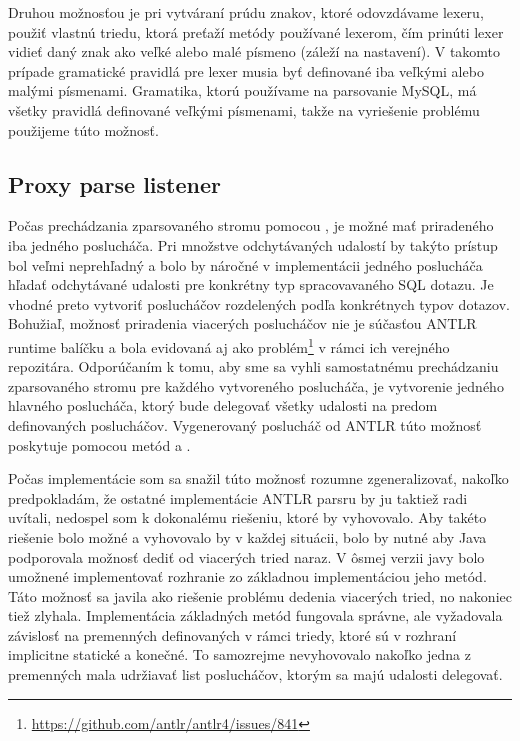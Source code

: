 Druhou možnosťou je pri vytváraní prúdu znakov, ktoré odovzdávame lexeru, použiť vlastnú triedu, ktorá preťaží metódy používané lexerom, čím prinúti lexer vidieť daný znak ako veľké alebo malé písmeno (záleží na nastavení). V takomto prípade gramatické pravidlá pre lexer musia byť definované iba veľkými alebo malými písmenami. Gramatika, ktorú používame na parsovanie MySQL, má všetky pravidlá definované veľkými písmenami, takže na vyriešenie problému použijeme túto možnosť. 

\subsection{Proxy parse listener}
Počas prechádzania zparsovaného stromu pomocou , je možné mať priradeného iba jedného poslucháča. Pri množstve odchytávaných udalostí by takýto prístup bol veľmi neprehľadný a bolo by náročné v implementácii jedného poslucháča hľadať odchytávané udalosti pre konkrétny typ spracovavaného SQL dotazu. Je vhodné preto vytvoriť poslucháčov rozdelených podľa konkrétnych typov dotazov. Bohužiaľ, možnosť priradenia viacerých poslucháčov nie je súčasťou ANTLR runtime balíčku a bola evidovaná aj ako problém\footnote{\url{https://github.com/antlr/antlr4/issues/841}} v rámci ich verejného repozitára. Odporúčaním k tomu, aby sme sa vyhli samostatnému prechádzaniu zparsovaného stromu pre každého vytvoreného poslucháča, je vytvorenie jedného hlavného poslucháča, ktorý bude delegovať všetky udalosti na predom definovaných poslucháčov. Vygenerovaný poslucháč od ANTLR túto možnosť poskytuje pomocou metód  a .

Počas implementácie som sa snažil túto možnosť rozumne zgeneralizovať, nakoľko predpokladám, že ostatné implementácie ANTLR parsru by ju taktiež radi uvítali, nedospel som k dokonalému riešeniu, ktoré by vyhovovalo. Aby takéto riešenie bolo možné a vyhovovalo by v každej situácii, bolo by nutné aby Java podporovala možnosť dediť od viacerých tried naraz. V ôsmej verzii javy bolo umožnené implementovať rozhranie zo základnou implementáciou jeho metód. Táto možnosť sa javila ako riešenie problému dedenia viacerých tried, no nakoniec tiež zlyhala. Implementácia základných metód fungovala správne, ale vyžadovala závislosť na premenných definovaných v rámci triedy, ktoré sú v rozhraní implicitne statické a konečné. To samozrejme nevyhovovalo nakoľko jedna z premenných mala udržiavať list poslucháčov, ktorým sa majú udalosti delegovať.

